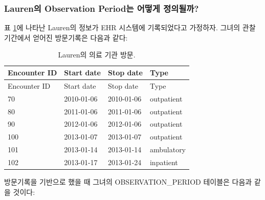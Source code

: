 \documentclass[11pt]{book}
\theoremstyle{definition}
\theoremstyle{definition}
\theoremstyle{definition}
\theoremstyle{remark}
\begin{document}
\subsubsection*{Lauren의 Observation Period는 어떻게
정의될까?}\label{lauren-observation-period--}

표 \ref{tab:encounters}에 나타난 Lauren의 정보가 EHR 시스템에
기록되었다고 가정하자. 그녀의 관찰 기간에서 얻어진 방문기록은 다음과
같다:

\begin{longtable}[]{@{}llll@{}}
\caption{\label{tab:encounters} Lauren의 의료 기관 방문.}\tabularnewline
\toprule
Encounter ID & Start date & Stop date & Type\tabularnewline
\midrule
\endfirsthead
\toprule
Encounter ID & Start date & Stop date & Type\tabularnewline
\midrule
\endhead
70 & 2010-01-06 & 2010-01-06 & outpatient\tabularnewline
80 & 2011-01-06 & 2011-01-06 & outpatient\tabularnewline
90 & 2012-01-06 & 2012-01-06 & outpatient\tabularnewline
100 & 2013-01-07 & 2013-01-07 & outpatient\tabularnewline
101 & 2013-01-14 & 2013-01-14 & ambulatory\tabularnewline
102 & 2013-01-17 & 2013-01-24 & inpatient\tabularnewline
\bottomrule
\end{longtable}

방문기록을 기반으로 했을 때 그녀의 OBSERVATION\_PERIOD 테이블은 다음과
같을 것이다:
\end{document}
